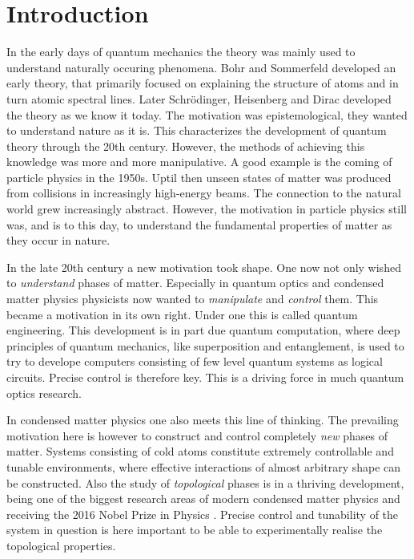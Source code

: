 
\chapter{Introduction} %

\label{Chapter1} %


In the early days of quantum mechanics the theory was mainly used to understand naturally occuring phenomena. Bohr and Sommerfeld developed an early theory, that primarily focused on explaining the structure of atoms and in turn atomic spectral lines. Later Schr{\"o}dinger, Heisenberg and Dirac developed the theory as we know it today. The motivation was epistemological, they wanted to understand nature as it is. This characterizes the development of quantum theory through the 20th century. However, the methods of achieving this knowledge was more and more manipulative. A good example is the coming of particle physics in the 1950s. Uptil then unseen states of matter was produced from collisions in increasingly high-energy beams. The connection to the natural world grew increasingly abstract. However, the motivation in particle physics still was, and is to this day, to understand the fundamental properties of matter as they occur in nature. 

In the late 20th century a new motivation took shape. One now not only wished to \textit{understand} phases of matter. Especially in quantum optics and condensed matter physics physicists now wanted to \textit{manipulate} and \textit{control} them. This became a motivation in its own right. Under one this is called quantum engineering. This development is in part due quantum computation, where deep principles of quantum mechanics, like superposition and entanglement, is used to try to develope computers consisting of few level quantum systems as logical circuits. Precise control is therefore key. This is a driving force in much quantum optics research. 

In condensed matter physics one also meets this line of thinking. The prevailing motivation here is however to construct and control completely \textit{new} phases of matter. Systems consisting of cold atoms constitute extremely controllable and tunable environments, where effective interactions of almost arbitrary shape can be constructed. Also the study of \textit{topological} phases is in a thriving development, being one of the biggest research areas of modern condensed matter physics and receiving the 2016 Nobel Prize in Physics \cite{NobelPrize2016}. Precise control and tunability of the system in question is here important to be able to experimentally realise the topological properties. 

